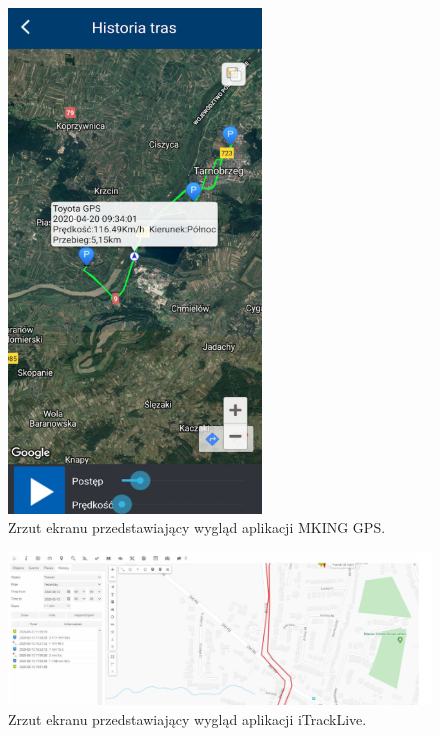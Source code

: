 \begin{figure}
	\centering
	\includegraphics[width=0.6\textwidth]{./graf/mkinggps.png}
	\caption{Zrzut ekranu przedstawiający wygląd aplikacji MKING GPS.}
	\label{mkinggps}
\end{figure}

\begin{figure}
	\centering
	\includegraphics[width=1\textwidth]{./graf/itrack.png}
	\caption{Zrzut ekranu przedstawiający wygląd aplikacji iTrackLive.}
	\label{itrack}
\end{figure}